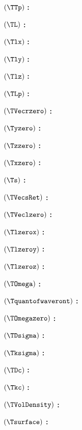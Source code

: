 $( \TTp )$ \textbf{:} \TTpdef

$( \TL )$ \textbf{:} \TLdef

$( \Tlx )$ \textbf{:} \Tlxdef

$( \Tly )$ \textbf{:} \Tlydef

$( \Tlz )$ \textbf{:} \Tlzdef

$( \TLp )$ \textbf{:} \TLpdef

$( \TVecrzero )$ \textbf{:} \TVecrzerodef

$( \Tyzero )$ \textbf{:} \Tyzerodef

$( \Tzzero )$ \textbf{:} \Tzzerodef

$( \Txzero )$ \textbf{:} \Txzerodef

$( \Ts )$ \textbf{:} \Tsdef

$( \TVecsRet )$ \textbf{:} \TVecsRetdef

$( \TVeclzero )$ \textbf{:} \TVeclzerodef

$( \Tlzerox )$ \textbf{:} \Tlzeroxdef

$( \Tlzeroy )$ \textbf{:} \Tlzeroydef

$( \Tlzeroz )$ \textbf{:} \Tlzerozdef

$( \TOmega )$ \textbf{:} \TOmegadef

$( \Tquantofwaveront )$ \textbf{:} \Tquantofwaverontdef

$( \TOmegazero )$ \textbf{:} \TOmegazerodef

$( \TDsigma )$ \textbf{:} \TDsigmadef

$( \Tksigma )$ \textbf{:} \Tksigmadef

$( \TDc )$ \textbf{:} \TDcdef

$( \Tkc )$ \textbf{:} \Tkcdef

$( \TVolDensity )$ \textbf{:} \TVolDensitydef

$( \Tsurface )$ \textbf{:} \Tsurfacedef